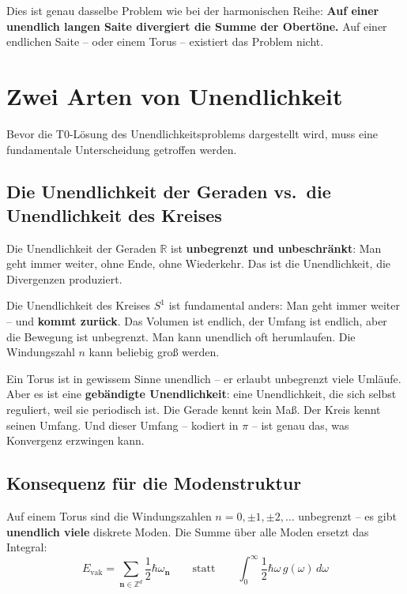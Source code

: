 	Dies ist genau dasselbe Problem wie bei der harmonischen Reihe: \textbf{Auf einer unendlich langen Saite divergiert die Summe der Obertöne.} Auf einer endlichen Saite -- oder einem Torus -- existiert das Problem nicht.
	
	
	\section{Zwei Arten von Unendlichkeit}
	
	Bevor die T0-Lösung des Unendlichkeitsproblems dargestellt wird, muss eine fundamentale Unterscheidung getroffen werden.
	
	\subsection{Die Unendlichkeit der Geraden vs.\ die Unendlichkeit des Kreises}
	
	Die Unendlichkeit der Geraden $\mathbb{R}$ ist \textbf{unbegrenzt und unbeschränkt}: Man geht immer weiter, ohne Ende, ohne Wiederkehr. Das ist die Unendlichkeit, die Divergenzen produziert.
	
	Die Unendlichkeit des Kreises $S^1$ ist fundamental anders: Man geht immer weiter -- und \textbf{kommt zurück}. Das Volumen ist endlich, der Umfang ist endlich, aber die Bewegung ist unbegrenzt. Man kann unendlich oft herumlaufen. Die Windungszahl $n$ kann beliebig groß werden.
	
	\begin{keypoint}
		Ein Torus ist in gewissem Sinne unendlich -- er erlaubt unbegrenzt viele Umläufe. Aber es ist eine \textbf{gebändigte Unendlichkeit}: eine Unendlichkeit, die sich selbst reguliert, weil sie periodisch ist. Die Gerade kennt kein Maß. Der Kreis kennt seinen Umfang. Und dieser Umfang -- kodiert in $\pi$ -- ist genau das, was Konvergenz erzwingen kann.
	\end{keypoint}
	
	\subsection{Konsequenz für die Modenstruktur}
	
	Auf einem Torus sind die Windungszahlen $n = 0, \pm 1, \pm 2, \ldots$ unbegrenzt -- es gibt \textbf{unendlich viele} diskrete Moden. Die Summe über alle Moden ersetzt das Integral:
	\begin{equation}
		E_{\text{vak}} = \sum_{\mathbf{n} \in \mathbb{Z}^d} \frac{1}{2} \hbar \omega_{\mathbf{n}} \qquad \text{statt} \qquad \int_0^{\infty} \frac{1}{2} \hbar \omega \, g(\omega) \, d\omega
	\end{equation}
	
